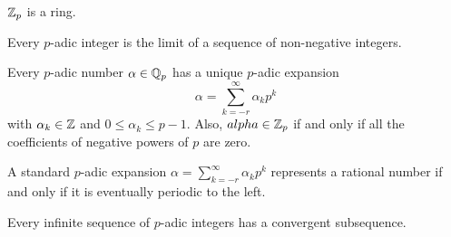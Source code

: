\begin{theorem}
    \(\mathbb{Z}_p\) is a ring.
\end{theorem}

\begin{theorem}
    Every \(p\)-adic integer is the limit of a sequence of non-negative integers.
\end{theorem}

\begin{theorem}
    Every \(p\)-adic number \(\alpha \in \mathbb{Q}_p\) has a unique \(p\)-adic expansion
    \[\alpha = \sum_{k=-r}^{\infty}\alpha_k p^k\]
    with \(\alpha_k \in \mathbb{Z}\) and \(0 \leq \alpha_k \leq p -1\). Also, \(alpha \in \mathbb{Z}_p\) if and only if all the coefficients of negative powers of \(p\) are zero.
\end{theorem}

\begin{theorem}
    A standard \(p\)-adic expansion \(\alpha = \sum_{k=-r}^{\infty}\alpha_k p^k\) represents a rational number if and only if it is eventually periodic to the left.
\end{theorem}

\begin{theorem}
    Every infinite sequence of \(p\)-adic integers has a convergent subsequence.
\end{theorem}